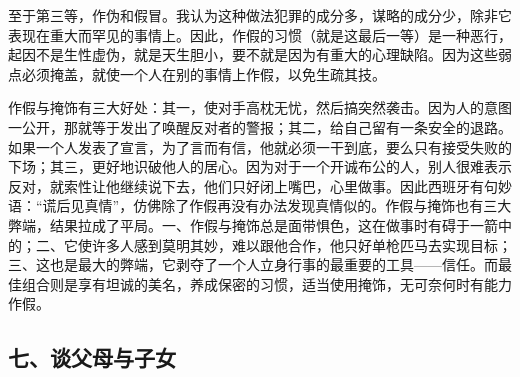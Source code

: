 \par 至于第三等，作伪和假冒。我认为这种做法犯罪的成分多，谋略的成分少，除非它表现在重大而罕见的事情上。因此，作假的习惯（就是这最后一等）是一种恶行，起因不是生性虚伪，就是天生胆小，要不就是因为有重大的心理缺陷。因为这些弱点必须掩盖，就使一个人在别的事情上作假，以免生疏其技。
\par 作假与掩饰有三大好处：其一，使对手高枕无忧，然后搞突然袭击。因为人的意图一公开，那就等于发出了唤醒反对者的警报；其二，给自己留有一条安全的退路。如果一个人发表了宣言，为了言而有信，他就必须一干到底，要么只有接受失败的下场；其三，更好地识破他人的居心。因为对于一个开诚布公的人，别人很难表示反对，就索性让他继续说下去，他们只好闭上嘴巴，心里做事。因此西班牙有句妙语：“谎后见真情”，仿佛除了作假再没有办法发现真情似的。作假与掩饰也有三大弊端，结果拉成了平局。一、作假与掩饰总是面带惧色，这在做事时有碍于一箭中的；二、它使许多人感到莫明其妙，难以跟他合作，他只好单枪匹马去实现目标；三、这也是最大的弊端，它剥夺了一个人立身行事的最重要的工具——信任。而最佳组合则是享有坦诚的美名，养成保密的习惯，适当使用掩饰，无可奈何时有能力作假。



\subsection*{七、谈父母与子女}

